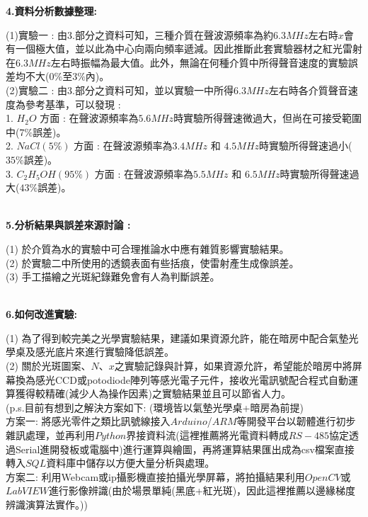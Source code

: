 \documentclass[UTF8]{ctexart}
\begin{document}
\begin{CJK*}{UTF8}{song}
\begin{large}
\textbf{4.資料分析數據整理: } \\
\end{large}
(1)實驗一 : 由3.部分之資料可知，三種介質在聲波源頻率為約$6.3MHz$左右時$x$會有一個極大值，並以此為中心向兩向頻率遞減。因此推斷此套實驗器材之紅光雷射在$6.3MHz$左右時振幅為最大值。此外，無論在何種介質中所得聲音速度的實驗誤差均不大($0\%$至$3\%$內)。 \\


(2)實驗二 : 由3.部分之資料可知，並以實驗一中所得$6.3MHz$左右時各介質聲音速度為參考基準，可以發現 : \\
1. $H_{2}O$ 方面 :  在聲波源頻率為$5.6MHz$時實驗所得聲速微過大，但尚在可接受範圍中($7\%$誤差)。 \\
2. $NaCl (5\%)$ 方面 : 在聲波源頻率為$3.4MHz$ 和 $4.5MHz$時實驗所得聲速過小($35\%$誤差)。\\
3. $C_{2}H_{5}OH (95\%)$ 方面 : 在聲波源頻率為$5.5MHz$ 和 $6.5MHz$時實驗所得聲速過大($43\%$誤差)。\\
 \\


\begin{large}
\textbf{5.分析結果與誤差來源討論 :} \\
\end{large}
(1) 於介質為水的實驗中可合理推論水中應有雜質影響實驗結果。 \\
(2) 於實驗二中所使用的透鏡表面有些括痕，使雷射產生成像誤差。 \\
(3) 手工描繪之光斑紀錄難免會有人為判斷誤差。 \\
 \\


\begin{large}
\textbf{6.如何改進實驗: } \\
\end{large}
(1) 為了得到較完美之光學實驗結果，建議如果資源允許，能在暗房中配合氣墊光學桌及感光底片來進行實驗降低誤差。 \\
(2) 關於光斑圖案、$N$、$x$之實驗記錄與計算，如果資源允許，希望能於暗房中將屏幕換為感光CCD或potodiode陣列等感光電子元件，接收光電訊號配合程式自動運算獲得較精確(減少人為操作因素)之實驗結果並且可以節省人力。\\
(p.s.目前有想到之解決方案如下: (環境皆以氣墊光學桌+暗房為前提) \\
方案一: 將感光零件之類比訊號線接入$Arduino$/$ARM$等開發平台以韌體進行初步雜訊處理，並再利用$Python$界接資料流(這裡推薦將光電資料轉成$RS-485$協定透過Serial進開發板或電腦中)進行運算與繪圖，再將運算結果匯出成為csv檔案直接轉入$SQL$資料庫中儲存以方便大量分析與處理。\\
方案二: 利用Webcam或ip攝影機直接拍攝光學屏幕，將拍攝結果利用$OpenCV$或$LabVIEW$進行影像辨識(由於場景單純(黑底+紅光斑)，因此這裡推薦以邊緣梯度辨識演算法實作。)) \\
 \\


\end{CJK*}
\end{document}
